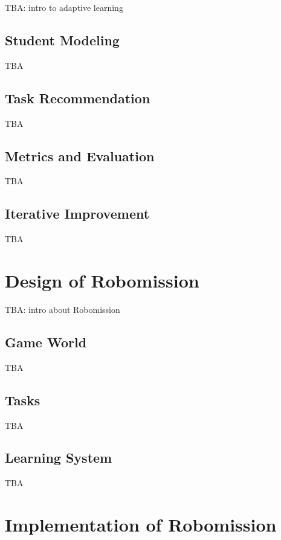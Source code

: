 \documentclass[
    digital,    %
    oneside,    %
    color,
    11pt,
    nocover,
    notable,
    nolof,
    nolot,
    final
]{fithesis3}
\begin{document}
TBA: intro to adaptive learning


\section{Student Modeling}
\label{sec:student-modeling}

TBA


\section{Task Recommendation}
\label{sec:task-recommendation}

TBA


\section{Metrics and Evaluation}
\label{sec:metrics-and-evaluation}

TBA


\section{Iterative Improvement}
\label{sec:iterative-improvement}

TBA


\chapter{Design of Robomission}
\label{chap:design-of-robomission}

TBA: intro about Robomission

\section{Game World}
\label{sec:robomission.game-world}

TBA

\section{Tasks}
\label{sec:robomission.tasks}

TBA


\section{Learning System}
\label{sec:robomission.system}

TBA


\chapter{Implementation of Robomission}
\label{chap:implementation-of-robomission}
\end{document}

